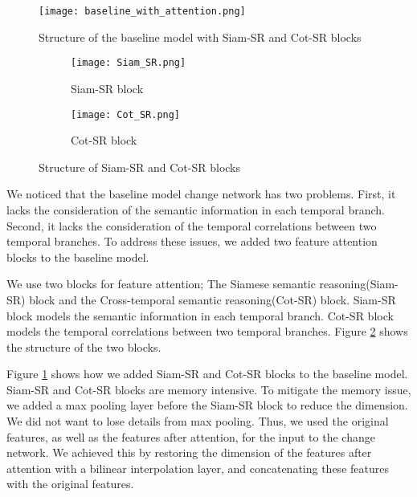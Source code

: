 \documentclass[../main.tex]{subfiles}
\begin{document}
\begin{figure}[h]
    \centering
    \texttt{[image: baseline\_with\_attention.png]}
    \caption{Structure of the baseline model with Siam-SR and Cot-SR blocks}
    \label{fig:baseline_with_attention}
\end{figure}

\begin{figure}[h]
    \centering
    \begin{subfigure}[b]{0.21\linewidth}
        \texttt{[image: Siam\_SR.png]}
        \caption{Siam-SR block}
    \end{subfigure}
    \begin{subfigure}[b]{0.4\linewidth}
        \texttt{[image: Cot\_SR.png]}
        \caption{Cot-SR block}
    \end{subfigure}
    \caption{Structure of Siam-SR and Cot-SR blocks\cite{Ding_2022_Bi_SRNet}}
    \label{fig:attention_blocks}
\end{figure}

We noticed that the baseline model change network has two problems. First, it lacks the consideration of the semantic information in each temporal branch. Second, it lacks the consideration of the temporal correlations between two temporal branches. To address these issues, we added two feature attention blocks to the baseline model.

We use two blocks for feature attention; The Siamese semantic reasoning(Siam-SR) block and the Cross-temporal semantic reasoning(Cot-SR) block. Siam-SR block models the semantic information in each temporal branch. Cot-SR block models the temporal correlations between two temporal branches\cite{Ding_2022_Bi_SRNet}. Figure \ref{fig:attention_blocks} shows the structure of the two blocks.

Figure \ref{fig:baseline_with_attention} shows how we added Siam-SR and Cot-SR blocks to the baseline model. Siam-SR and Cot-SR blocks are memory intensive. To mitigate the memory issue, we added a max pooling layer before the Siam-SR block to reduce the dimension. We did not want to lose details from max pooling. Thus, we used the original features, as well as the features after attention, for the input to the change network. We achieved this by restoring the dimension of the features after attention with a bilinear interpolation layer, and concatenating these features with the original features.
\end{document}
